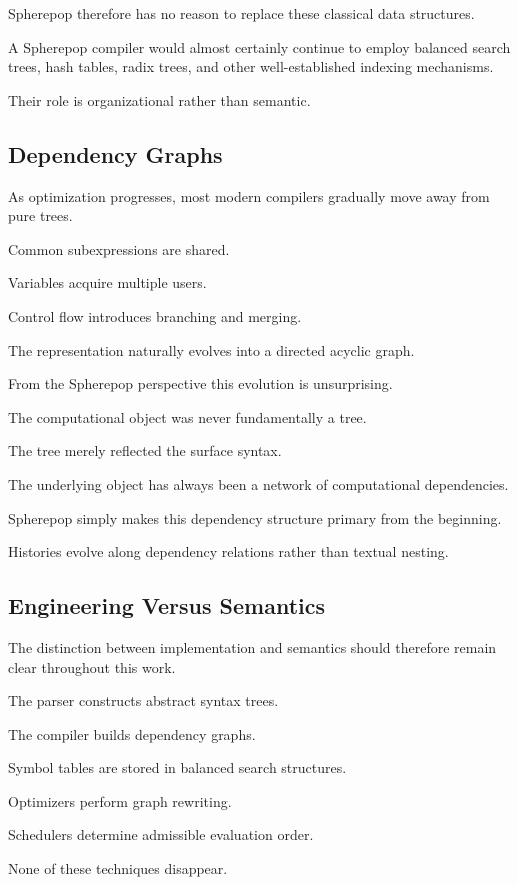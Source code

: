 \documentclass[12pt,oneside]{article}
\theoremstyle{definition}
\theoremstyle{remark}
\begin{document}
Spherepop therefore has no reason to replace these classical data structures.

A Spherepop compiler would almost certainly continue to employ balanced search
trees, hash tables, radix trees, and other well-established indexing
mechanisms.

Their role is organizational rather than semantic.

\subsection{Dependency Graphs}

As optimization progresses, most modern compilers gradually move away from
pure trees.

Common subexpressions are shared.

Variables acquire multiple users.

Control flow introduces branching and merging.

The representation naturally evolves into a directed acyclic graph.

From the Spherepop perspective this evolution is unsurprising.

The computational object was never fundamentally a tree.

The tree merely reflected the surface syntax.

The underlying object has always been a network of computational
dependencies.

Spherepop simply makes this dependency structure primary from the beginning.

Histories evolve along dependency relations rather than textual nesting.

\subsection{Engineering Versus Semantics}

The distinction between implementation and semantics should therefore remain
clear throughout this work.

The parser constructs abstract syntax trees.

The compiler builds dependency graphs.

Symbol tables are stored in balanced search structures.

Optimizers perform graph rewriting.

Schedulers determine admissible evaluation order.

None of these techniques disappear.
\end{document}
